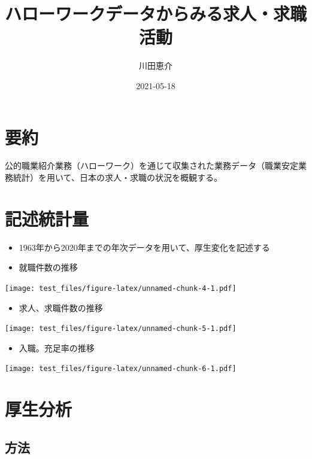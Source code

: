 \documentclass[
]{book}
\title{ハローワークデータからみる求人・求職活動}
\author{川田恵介}
\date{2021-05-18}
\providecommand{\tightlist}{%
  \setlength{\itemsep}{0pt}\setlength{\parskip}{0pt}}
\begin{document}
\maketitle

{
\setcounter{tocdepth}{1}
\tableofcontents
}
\hypertarget{ux8981ux7d04}{%
\chapter{要約}\label{ux8981ux7d04}}

公的職業紹介業務（ハローワーク）を通じて収集された業務データ（職業安定業務統計）を用いて、日本の求人・求職の状況を概観する。

\hypertarget{ux8a18ux8ff0ux7d71ux8a08ux91cf}{%
\chapter{記述統計量}\label{ux8a18ux8ff0ux7d71ux8a08ux91cf}}

\begin{itemize}
\item
  1963年から2020年までの年次データを用いて、厚生変化を記述する
\item
  就職件数の推移
\end{itemize}

\texttt{[image: test\_files/figure-latex/unnamed-chunk-4-1.pdf]}

\begin{itemize}
\tightlist
\item
  求人、求職件数の推移
\end{itemize}

\texttt{[image: test\_files/figure-latex/unnamed-chunk-5-1.pdf]}

\begin{itemize}
\tightlist
\item
  入職。充足率の推移
\end{itemize}

\texttt{[image: test\_files/figure-latex/unnamed-chunk-6-1.pdf]}

\hypertarget{ux539aux751fux5206ux6790}{%
\chapter{厚生分析}\label{ux539aux751fux5206ux6790}}

\hypertarget{ux65b9ux6cd5}{%
\section{方法}\label{ux65b9ux6cd5}}
\end{document}
